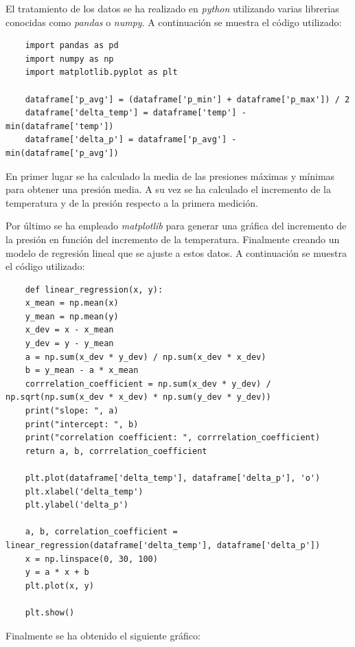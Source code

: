 \documentclass{article}
\begin{document}
El tratamiento de los datos se ha realizado en \textit{python} utilizando varias librerias conocidas 
como \textit{pandas} o \textit{numpy}. A continuación se muestra el código utilizado:
\begin{verbatim}
    import pandas as pd
    import numpy as np
    import matplotlib.pyplot as plt

    dataframe['p_avg'] = (dataframe['p_min'] + dataframe['p_max']) / 2
    dataframe['delta_temp'] = dataframe['temp'] - min(dataframe['temp'])
    dataframe['delta_p'] = dataframe['p_avg'] - min(dataframe['p_avg'])
\end{verbatim}

En primer lugar se ha calculado la media de las presiones máximas y mínimas para obtener una presión media.
A su vez se ha calculado el incremento de la temperatura y de la presión respecto a la primera medición.

Por último se ha empleado \textit{matplotlib} para generar una gráfica del incremento de la presión en función del incremento de la temperatura.
Finalmente creando un modelo de regresión lineal que se ajuste a estos datos. A continuación se muestra el código utilizado:

\begin{verbatim}
    def linear_regression(x, y):
    x_mean = np.mean(x)
    y_mean = np.mean(y)
    x_dev = x - x_mean
    y_dev = y - y_mean
    a = np.sum(x_dev * y_dev) / np.sum(x_dev * x_dev)
    b = y_mean - a * x_mean
    corrrelation_coefficient = np.sum(x_dev * y_dev) / np.sqrt(np.sum(x_dev * x_dev) * np.sum(y_dev * y_dev))
    print("slope: ", a)
    print("intercept: ", b)
    print("correlation coefficient: ", corrrelation_coefficient)
    return a, b, corrrelation_coefficient

    plt.plot(dataframe['delta_temp'], dataframe['delta_p'], 'o')
    plt.xlabel('delta_temp')
    plt.ylabel('delta_p')

    a, b, correlation_coefficient = linear_regression(dataframe['delta_temp'], dataframe['delta_p'])
    x = np.linspace(0, 30, 100)
    y = a * x + b
    plt.plot(x, y)

    plt.show()
\end{verbatim}

Finalmente se ha obtenido el siguiente gráfico:
\end{document}
